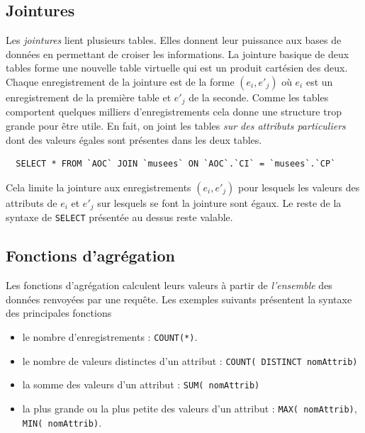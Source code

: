\subsection{Jointures}
Les \emph{jointures} lient plusieurs tables. Elles donnent leur puissance aux bases de données en permettant de croiser les informations.\newline
La jointure basique de deux tables forme une nouvelle table virtuelle qui est un produit cartésien des deux. Chaque enregistrement de la jointure est de la forme $(e_i,e'_j)$ où $e_i$ est un enregistrement de la première table et $e'_j$ de la seconde. Comme les tables comportent quelques milliers d'enregistrements cela donne une structure trop grande pour être utile.\newline
En fait, on joint les tables \emph{sur des attributs particuliers} dont des valeurs égales sont présentes dans les deux tables.
\begin{verbatim}
  SELECT * FROM `AOC` JOIN `musees` ON `AOC`.`CI` = `musees`.`CP`
\end{verbatim}
Cela limite la jointure aux enregistrements $(e_i,e'_j)$ pour lesquels les valeurs des attributs de $e_i$ et $e'_j$ sur lesquels se font la jointure sont égaux.\newline
Le reste de la syntaxe de \verb|SELECT| présentée au dessus reste valable.

\subsection{Fonctions d'agrégation}
Les fonctions d'agrégation calculent leurs valeurs à partir de \emph{l'ensemble} des données renvoyées par une requête.\newline
Les exemples suivants présentent la syntaxe des principales fonctions 
\begin{itemize}
  \item le nombre d'enregistrements : \texttt{COUNT(*)}.
  \item le nombre de valeurs distinctes d'un attribut : \texttt{COUNT( DISTINCT nomAttrib)}
  \item la somme des valeurs d'un attribut : \texttt{SUM( nomAttrib)}
  \item la plus grande ou la plus petite des valeurs d'un attribut : \texttt{MAX( nomAttrib)}, \texttt{MIN( nomAttrib)}.
\end{itemize}



